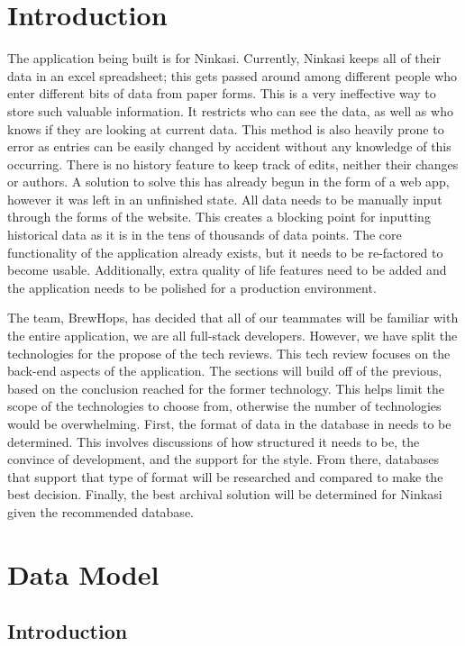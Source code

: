 
\section{Introduction}

The application being built is for Ninkasi.  Currently, Ninkasi keeps all of their data in an excel spreadsheet; this gets passed around among different people who enter different bits of data from paper forms.  This is a very ineffective way to store such valuable information.  It restricts who can see the data, as well as who knows if they are looking at current data.  This method is also heavily prone to error as entries can be easily changed by accident without any knowledge of this occurring.  There is no history feature to keep track of edits, neither their changes or authors.  A solution to solve this has already begun in the form of a web app, however it was left in an unfinished state.  All data needs to be manually input through the forms of the website.  This creates a blocking point for inputting historical data as it is in the tens of thousands of data points.  The core functionality of the application already exists, but it needs to be re-factored to become usable.  Additionally, extra quality of life features need to be added and the application needs to be polished for a production environment.

The team, BrewHops, has decided that all of our teammates will be familiar with the entire application, we are all full-stack developers.  However, we have split the technologies for the propose of the tech reviews.  This tech review focuses on the back-end aspects of the application.  The sections will build off of the previous, based on the conclusion reached for the former technology.  This helps limit the scope of the technologies to choose from, otherwise the number of technologies would be overwhelming.  First, the format of data in the database in needs to be determined.  This involves discussions of how structured it needs to be, the convince of development, and the support for the style.  From there, databases that support that type of format will be researched and compared to make the best decision.  Finally, the best archival solution will be determined for Ninkasi given the recommended database.

\section{Data Model}

    \subsection{Introduction}
    
